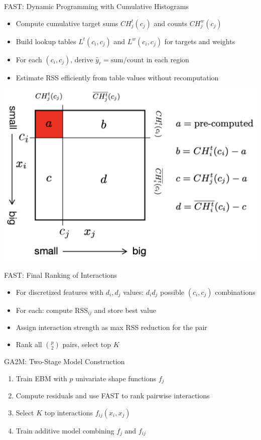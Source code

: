 \documentclass[11pt,compress,t,notes=noshow,aspectratio=169,xcolor=table]{beamer}
\begin{document}
\begin{frame}{FAST: Dynamic Programming with Cumulative Histograms} \begin{itemize} \item Compute cumulative target sums $CH_j^t(c_j)$ and counts $CH_j^w(c_j)$ \item Build lookup tables $L^t(c_i, c_j)$ and $L^w(c_i, c_j)$ for targets and weights \item For each $(c_i, c_j)$, derive $\hat{y}_r = \text{sum}/\text{count}$ in each region \item Estimate RSS efficiently from table values without recomputation \end{itemize} \includegraphics[width=\linewidth]{figure/FAST.png} \end{frame}

\begin{frame}{FAST: Final Ranking of Interactions} \begin{itemize} \item For discretized features with $d_i, d_j$ values: $d_id_j$ possible $(c_i,c_j)$ combinations \item For each: compute $\text{RSS}_{ij}$ and store best value \item Assign interaction strength as max RSS reduction for the pair \item Rank all $\binom{p}{2}$ pairs, select top $K$ \end{itemize} \end{frame}

\begin{frame}{GA2M: Two-Stage Model Construction} \begin{enumerate} \item Train EBM with $p$ univariate shape functions $f_j$ \item Compute residuals and use FAST to rank pairwise interactions \item Select $K$ top interactions $f_{ij}(x_i, x_j)$ \item Train additive model combining $f_j$ and $f_{ij}$ \end{enumerate} \end{frame}
\end{document}
